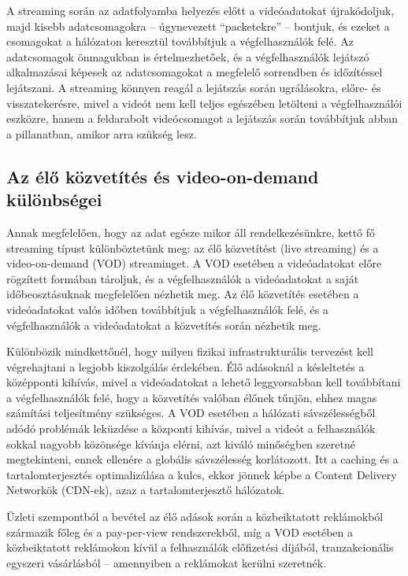 A streaming során az adatfolyamba helyezés előtt a videóadatokat újrakódoljuk, majd kisebb adatcsomagokra -- úgynevezett ``packetekre'' -- bontjuk, és ezeket a csomagokat a hálózaton keresztül továbbítjuk a végfelhasználók felé. Az adatcsomagok önmagukban is értelmezhetőek, és a végfelhasználók lejátszó alkalmazásai képesek az adatcsomagokat a megfelelő sorrendben és időzítéssel lejátszani. A streaming könnyen reagál a lejátszás során ugrálásokra, előre- és visszatekerésre, mivel a videót nem kell teljes egészében letölteni a végfelhasználói eszközre, hanem a feldarabolt videócsomagot a lejátszás során továbbítjuk abban a pillanatban, amikor arra szükség lesz.

\subsection{Az élő közvetítés és video-on-demand különbségei}

Annak megfelelően, hogy az adat egésze mikor áll rendelkezésünkre, kettő fő streaming típust különböztetünk meg: az élő közvetítést (live streaming) és a video-on-demand (VOD) streaminget. A VOD esetében a videóadatokat előre rögzített formában tároljuk, és a végfelhasználók a videóadatokat a saját időbeosztásuknak megfelelően nézhetik meg. Az élő közvetítés esetében a videóadatokat valós időben továbbítjuk a végfelhasználók felé, és a végfelhasználók a videóadatokat a közvetítés során nézhetik meg.

Különbözik mindkettőnél, hogy milyen fizikai infrastrukturális tervezést kell végrehajtani a legjobb kiszolgálás érdekében. Élő adásoknál a késleltetés a középponti kihívás, mivel a videóadatokat a lehető leggyorsabban kell továbbítani a végfelhasználók felé, hogy a közvetítés valóban élőnek tűnjön, ehhez magas számítási teljesítmény szükséges. A VOD esetében a hálózati sávszélességből adódó problémák leküzdése a központi kihívás, mivel a videót a felhasználók sokkal nagyobb közönsége kívánja elérni, azt kiváló minőségben szeretné megtekinteni, ennek ellenére a globális sávszélesség korlátozott. Itt a caching és a tartalomterjesztés optimalizálása a kulcs, ekkor jönnek képbe a Content Delivery Networkök (CDN-ek), azaz a tartalomterjesztő hálózatok.

Üzleti szempontból a bevétel az élő adások során a közbeiktatott reklámokból származik főleg és a pay-per-view rendszerekből, míg a VOD esetében a közbeiktatott reklámokon kívül a felhasználók előfizetési díjából, tranzakcionális egyszeri vásárlásból -- amennyiben a reklámokat kerülni szeretnék.

